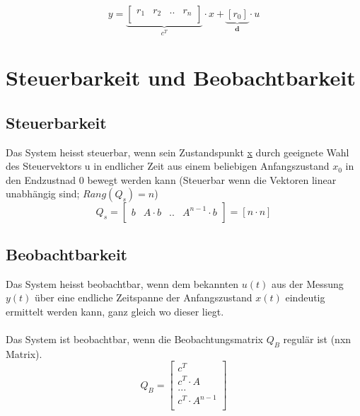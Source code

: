 \[
	y=
	\underbrace{
			\begin{bmatrix}
				r_1 & r_2 & .. & r_n\\
			\end{bmatrix}
	}_{\textbf{$c^T$}}
	\cdot x  +
	\underbrace{
		\left[ r_0 \right] 
	}_{\textbf{d}}
	\cdot u
\]
\section{Steuerbarkeit und Beobachtbarkeit}
\subsection{Steuerbarkeit}
Das System heisst steuerbar, wenn sein Zustandspunkt \underline{x} durch geeignete Wahl des Steuervektors u in endlicher Zeit aus einem beliebigen Anfangszustand $x_0$ in den Endzustnad 0 bewegt werden kann (Steuerbar wenn die Vektoren linear unabhängig sind; $Rang(Q_s) = n$)
\[
	Q_s = 
	\begin{bmatrix}
			b	&	A\cdot b	& .. & A^{n-1} \cdot b\\
	\end{bmatrix}
	= \left[ n \cdot n\right] 
\]
\subsection{Beobachtbarkeit}
Das System heisst beobachtbar, wenn dem bekannten $u(t)$ aus der Messung $y(t)$ über eine endliche Zeitspanne der Anfangszustand $x(t)$ eindeutig ermittelt werden kann, ganz gleich wo dieser liegt.\\
\\
Das System ist beobachtbar, wenn die Beobachtungsmatrix $Q_B$ regulär ist (nxn Matrix).
\[
	Q_B=
	\begin{bmatrix}
		c^T\\
		c^T \cdot A\\
		...\\
		c^T\cdot A^{n-1}\\
	\end{bmatrix}
\]
